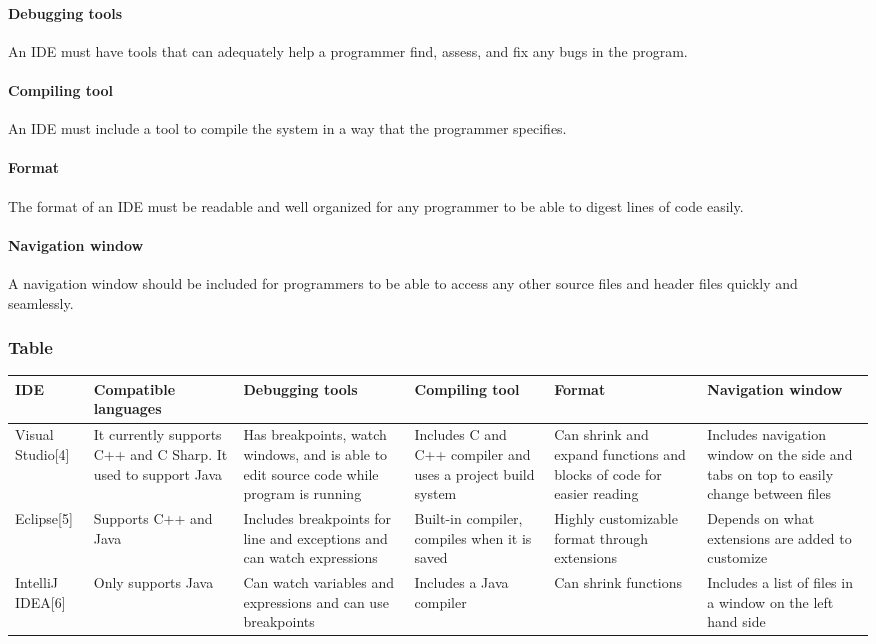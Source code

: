 \documentclass[10pt,letterpaper,onecolumn,draftclsnofoot]{IEEEtran}
\begin{document}
\paragraph{Debugging tools}
An IDE must have tools that can adequately help a programmer find, assess, and fix any bugs in the program.

\paragraph{Compiling tool}
An IDE must include a tool to compile the system in a way that the programmer specifies.

\paragraph{Format}
The format of an IDE must be readable and well organized for any programmer to be able to digest lines of code easily.

\paragraph{Navigation window}
A navigation window should be included for programmers to be able to access any other source files and header files quickly and seamlessly.

\subsubsection{Table}
\begin{center}
\begin{tabular}{ ||B|M|M|M|M|M|| } 
\hline
IDE & Compatible languages & Debugging tools & Compiling tool & Format & Navigation window\\
 \hline
 Visual Studio[4] & It currently supports C++ and C Sharp. It used to support Java & Has breakpoints, watch windows, and is able to edit source code while program is running & Includes C and C++ compiler and uses a project build system & Can shrink and expand functions and blocks of code for easier reading & Includes navigation window on the side and tabs on top to easily change between files\\ 
 \hline
 Eclipse[5] & Supports C++ and Java & Includes breakpoints for line and exceptions and can watch expressions & Built-in compiler, compiles when it is saved & Highly customizable format through extensions & Depends on what extensions are added to customize\\ 
 \hline
 IntelliJ IDEA[6] & Only supports Java & Can watch variables and expressions and can use breakpoints & Includes a Java compiler & Can shrink functions & Includes a list of files in a window on the left hand side\\ 
 \hline
\end{tabular}
\end{center}
\end{document}
